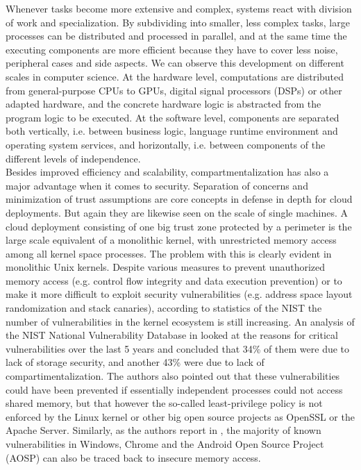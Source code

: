 Whenever tasks become more extensive and complex, systems react with division of work and specialization. By subdividing into smaller, less complex tasks, large processes can be distributed and processed in parallel, and at the same time the executing components are more efficient because they have to cover less noise, peripheral cases and side aspects. We can observe this development on different scales in computer science. At the hardware level, computations are distributed from general-purpose CPUs to GPUs, digital signal processors (DSPs) or other adapted hardware, and the concrete hardware logic is abstracted from the program logic to be executed. At the software level, components are separated both vertically, i.e. between business logic, language runtime environment and operating system services, and horizontally, i.e. between components of the different levels of independence. \\

Besides improved efficiency and scalability, compartmentalization has also a major advantage when it comes to security. Separation of concerns and minimization of trust assumptions are core concepts in defense in depth for cloud deployments. But again they are likewise seen on the scale of single machines. A cloud deployment consisting of one big trust zone protected by a perimeter is the large scale equivalent of a monolithic kernel, with unrestricted memory access among all kernel space processes. The problem with this is clearly evident in monolithic Unix kernels. Despite various measures to prevent unauthorized memory access (e.g. control flow integrity and data execution prevention) or to make it more difficult to exploit security vulnerabilities (e.g. address space layout randomization and stack canaries), according to statistics of the NIST\cite{nvd} the number of vulnerabilities in the kernel ecosystem is still increasing. An analysis of the NIST National Vulnerability Database in \cite{mckee2022novel} looked at the reasons for critical vulnerabilities over the last 5 years and concluded that 34\% of them were due to lack of storage security, and another 43\% were due to lack of compartimentalization. The authors also pointed out that these vulnerabilities could have been prevented if essentially independent processes could not access shared memory, but that however the so-called least-privilege policy is not enforced by the Linux kernel or other big open source projects as OpenSSL or the Apache Server. 
Similarly, as the authors report in \cite{kirth2022pkru}, the majority of known vulnerabilities in Windows, Chrome and the Android Open Source Project (AOSP) can also be traced back to insecure memory access. \\

